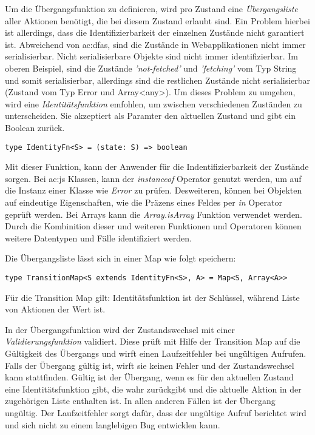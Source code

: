 Um die Übergangsfunktion zu definieren, wird pro Zustand eine \textit{Übergangsliste} aller Aktionen benötigt, die bei diesem Zustand erlaubt sind. Ein Problem hierbei ist allerdings, dass die Identifizierbarkeit der einzelnen Zustände nicht garantiert ist.
Abweichend von \acrlong{ac:dfa}s, sind die Zustände in Webapplikationen nicht immer serialisierbar. Nicht serialisierbare Objekte sind nicht immer identifizierbar. Im oberen Beispiel, sind die Zustände \textit{'not-fetched'} und \textit{'fetching'} vom Typ String und somit serialisierbar, allerdings sind die restlichen Zustände nicht serialisierbar (Zustand vom Typ Error und Array<any>). Um dieses Problem zu umgehen, wird eine \textit{Identitätsfunktion} emfohlen, um zwischen verschiedenen Zuständen zu unterscheiden. Sie akzeptiert als Paramter den aktuellen Zustand und gibt ein Boolean zurück.

\begin{lstlisting}
type IdentityFn<S> = (state: S) => boolean
\end{lstlisting}


Mit dieser Funktion, kann der Anwender für die Indentifizierbarkeit der Zustände sorgen. Bei \acrlong{ac:js} Klassen, kann der \textit{instanceof} Operator genutzt werden, um auf die Instanz einer Klasse wie \textit{Error} zu prüfen.\cite{jsInstanceofOperator} Desweiteren, können bei Objekten auf eindeutige Eigenschaften, wie die Präzens eines Feldes per \textit{in} Operator geprüft werden.\cite{jsInOperator} Bei Arrays kann die \textit{Array.isArray} Funktion verwendet werden.\cite{jsIsArray} Durch die Kombinition dieser und weiteren Funktionen und Operatoren können weitere Datentypen und Fälle identifiziert werden.

Die Übergangsliste lässt sich in einer Map wie folgt speichern:

\begin{lstlisting}
type TransitionMap<S extends IdentityFn<S>, A> = Map<S, Array<A>>
\end{lstlisting}

Für die Transition Map gilt: Identitätsfunktion ist der Schlüssel, während Liste von Aktionen der Wert ist.

In der Übergangsfunktion wird der Zustandswechsel mit einer \textit{Validierungsfunktion} validiert. Diese prüft mit Hilfe der Transition Map auf die Gültigkeit des Übergangs und wirft einen Laufzeitfehler bei ungültigen Aufrufen. Falls der Übergang gültig ist, wirft sie keinen Fehler und der Zustandswechsel kann stattfinden. Gültig ist der Übergang, wenn es für den aktuellen Zustand eine Identitätsfunktion gibt, die wahr zurückgibt und die aktuelle Aktion in der zugehörigen Liste enthalten ist. In allen anderen Fällen ist der Übergang ungültig.
Der Laufzeitfehler sorgt dafür, dass der ungültige Aufruf berichtet wird und sich nicht zu einem langlebigen Bug entwicklen kann.

